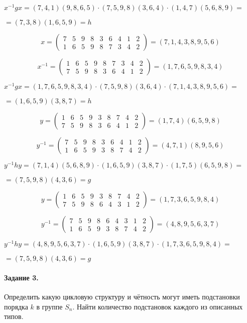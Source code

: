 \documentclass[utf8,14pt,a4paper,oneside,russian]{book}
\begin{document}
	$x^{-1}gx=(7,4,1)(9,8,6,5)\cdot(7,5,9,8)(3,6,4)\cdot(1,4,7)(5,6,8,9)=$
	
	$=(7,3,8)(1,6,5,9)=h$
	
	\[ x = \left( 
	\begin{array}{ccccccccc}
	7&5&9&8&3&6&4&1&2\\
	1&6&5&9&8&7&3&4&2
	\end{array} 
	\right) = (7,1,4,3,8,9,5,6) \]
	
	\[ x^{-1} = \left( 
	\begin{array}{ccccccccc}
	1&6&5&9&8&7&3&4&2\\
	7&5&9&8&3&6&4&1&2
	\end{array} 
	\right) = (1,7,6,5,9,8,3,4) \]
	
	$x^{-1}gx=(1,7,6,5,9,8,3,4)\cdot(7,5,9,8)(3,6,4)\cdot(7,1,4,3,8,9,5,6)=$
	
	$=(1,6,5,9)(3,8,7)=h$
	
	\[ y = \left( 
	\begin{array}{ccccccccc}
	1&6&5&9&3&8&7&4&2\\
	7&5&9&8&3&6&4&1&2
	\end{array} 
	\right) = (1,7,4)(6,5,9,8) \]
	
	\[ y^{-1} = \left( 
	\begin{array}{ccccccccc}
	7&5&9&8&3&6&4&1&2\\
	1&6&5&9&3&8&7&4&2
	\end{array} 
	\right) = (4,7,1)(8,9,5,6) \]
	
	$y^{-1}hy=(7,1,4)(5,6,8,9)\cdot(1,6,5,9)(3,8,7)\cdot(1,7,5)(6,5,9,8)=$
	
	$=(7,5,9,8)(4,3,6)=g$
	
	\[ y = \left( 
	\begin{array}{ccccccccc}
	1&6&5&9&3&8&7&4&2\\
	7&5&9&8&6&4&3&1&2
	\end{array} 
	\right) = (1,7,3,6,5,9,8,4) \]
	
	\[ y^{-1} = \left( 
	\begin{array}{ccccccccc}
	7&5&9&8&6&4&3&1&2\\
	1&6&5&9&3&8&7&4&2
	\end{array} 
	\right) = (4,8,9,5,6,3,7) \]
	
	$y^{-1}hy=(4,8,9,5,6,3,7)\cdot(1,6,5,9)(3,8,7)\cdot(1,7,3,6,5,9,8,4)=$
	
	$=(7,5,9,8)(4,3,6)=g$
	
	\paragraph*{Задание 3.} Определить какую цикловую структуру и чётность могут иметь подстановки порядка $k$ в группе $S_{n}$. Найти количество подстановок каждого из описанных типов.
	
\end{document}

